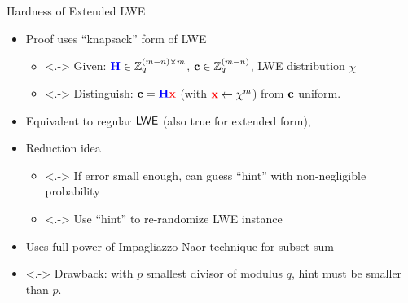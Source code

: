 \begin{frame}{Hardness of Extended LWE}
\begin{itemize}
\item<+-> Proof uses ``knapsack'' form of LWE
  \begin{itemize}
  \item<.-> Given: ${\color{blue} \mathbf{H}} \in \mathbb{Z}_q^{(m-n)\times m}$, $\mathbf{c} \in
    \mathbb{Z}_q^{(m-n)}$, LWE distribution $\chi$
\smallskip
  \item<.-> Distinguish: $\mathbf{c}={\color{blue} \mathbf{H}}{\color{red} \mathbf{x}}$ (with ${\color{red} \mathbf{x}}\gets \chi^{m}$) from $\mathbf{c}$ uniform.

     

  \end{itemize}
\item<+-> Equivalent to regular $\textsf{LWE}$ (also true for extended form),~
 \item<+-> Reduction idea
   \begin{itemize} 
    \item<.-> If error small enough, can guess ``hint'' with
      non-negligible probability
\smallskip
    \item<.-> Use ``hint'' to re-randomize LWE instance
\end{itemize}
  \item<+-> Uses full power of Impagliazzo-Naor 
    technique for
    subset sum
    \item<.-> Drawback: with $p$ smallest divisor of modulus $q$, hint must be smaller than $p$. 
  \end{itemize}

\end{frame}

